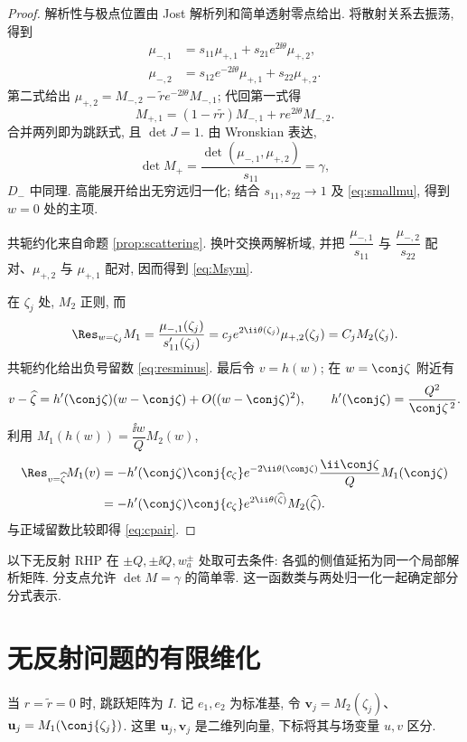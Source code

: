 \begin{proof}
解析性与极点位置由 Jost 解析列和简单透射零点给出. 将散射关系去振荡, 得到
\begin{align*}
\mu_{-,1}&=s_{11}\mu_{+,1}+s_{21}e^{2\ii\theta}\mu_{+,2},\\
\mu_{-,2}&=s_{12}e^{-2\ii\theta}\mu_{+,1}+s_{22}\mu_{+,2}.
\end{align*}
第二式给出 $\mu_{+,2}=M_{-,2}-\widetilde r e^{-2\ii\theta}M_{-,1}$; 代回第一式得
\[
M_{+,1}=(1-r\widetilde r)M_{-,1}+r e^{2\ii\theta}M_{-,2}.
\]
合并两列即为跳跃式, 且 $\det J=1$. 由 Wronskian 表达,
\[
\det M_+=\dfrac{\det(\mu_{-,1},\mu_{+,2})}{s_{11}}=\gamma,
\]
$D_-$ 中同理. 高能展开给出无穷远归一化; 结合 $s_{11},s_{22}\to1$ 及 \eqref{eq:smallmu}, 得到 $w=0$ 处的主项.

共轭约化来自命题 \ref{prop:scattering}. 换叶交换两解析域, 并把 $\dfrac{\mu_{-,1}}{s_{11}}$ 与 $\dfrac{\mu_{-,2}}{s_{22}}$ 配对、$\mu_{+,2}$ 与 $\mu_{+,1}$ 配对, 因而得到 \eqref{eq:Msym}.

在 $\zeta_j$ 处, $M_2$ 正则, 而
\[
\Res_{w=\zeta_j}M_1
=\dfrac{\mu_{-,1}(\zeta_j)}{s_{11}'(\zeta_j)}
=c_j e^{2\ii\theta(\zeta_j)}\mu_{+,2}(\zeta_j)
=C_jM_2(\zeta_j).
\]
共轭约化给出负号留数 \eqref{eq:resminus}. 最后令 $v=h(w)$; 在 $w=\conj\zeta$ 附近有
\[
v-\widehat\zeta=h'(\conj\zeta)(w-\conj\zeta)+O((w-\conj\zeta)^2),
\qquad h'(\conj\zeta)=\dfrac{Q^2}{\conj\zeta^{\,2}}.
\]
利用 $M_1(h(w))=\dfrac{\ii w}{Q}M_2(w)$,
\begin{align*}
\Res_{v=\widehat\zeta}M_1(v)
&=-h'(\conj\zeta)\conj{c_\zeta}
e^{-2\ii\theta(\conj\zeta)}\dfrac{\ii\conj\zeta}{Q}M_1(\conj\zeta)\\
&=-h'(\conj\zeta)\conj{c_\zeta}
e^{2\ii\theta(\widehat\zeta)}M_2(\widehat\zeta).
\end{align*}
与正域留数比较即得 \eqref{eq:cpair}.
\end{proof}

以下无反射 RHP 在 $\pm Q,\pm\ii Q,w_a^\pm$ 处取可去条件: 各弧的侧值延拓为同一个局部解析矩阵. 分支点允许 $\det M=\gamma$ 的简单零. 这一函数类与两处归一化一起确定部分分式表示.

\section{无反射问题的有限维化}
当 $r=\widetilde r=0$ 时, 跳跃矩阵为 $I$. 记 $e_1,e_2$ 为标准基, 令
$\mathbf v_j=M_2(\zeta_j)$、$\mathbf u_j=M_1(\conj{\zeta_j})$. 这里 $\mathbf u_j,\mathbf v_j$ 是二维列向量, 下标将其与场变量 $u,v$ 区分.

